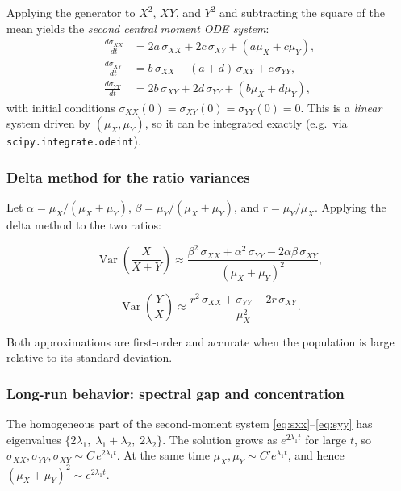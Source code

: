 \documentclass[12pt]{article}
\begin{document}
Applying the generator to $X^2$, $XY$, and $Y^2$ and subtracting the square
of the mean yields the \emph{second central moment ODE system}:
\begin{align}
	\frac{d\sigma_{XX}}{dt} &= 2a\,\sigma_{XX} + 2c\,\sigma_{XY}
	+ (a\mu_X + c\mu_Y), \label{eq:sxx}\\
	\frac{d\sigma_{XY}}{dt} &= b\,\sigma_{XX} + (a+d)\,\sigma_{XY}
	+ c\,\sigma_{YY}, \label{eq:sxy}\\
	\frac{d\sigma_{YY}}{dt} &= 2b\,\sigma_{XY} + 2d\,\sigma_{YY}
	+ (b\mu_X + d\mu_Y), \label{eq:syy}
\end{align}
with initial conditions $\sigma_{XX}(0)=\sigma_{XY}(0)=\sigma_{YY}(0)=0$.
This is a \emph{linear} system driven by $(\mu_X,\mu_Y)$, so it can be
integrated exactly (e.g.\ via \texttt{scipy.integrate.odeint}).

\subsubsection{Delta method for the ratio variances}

Let $\alpha = \mu_X/(\mu_X+\mu_Y)$, $\beta = \mu_Y/(\mu_X+\mu_Y)$,
and $r = \mu_Y/\mu_X$.  Applying the delta method to the two ratios:

\begin{equation}
	\operatorname{Var}\!\left(\frac{X}{X+Y}\right)
	\approx
	\frac{\beta^2\,\sigma_{XX} + \alpha^2\,\sigma_{YY}
		- 2\alpha\beta\,\sigma_{XY}}{(\mu_X+\mu_Y)^2},
	\label{eq:var_r1}
\end{equation}

\begin{equation}
	\operatorname{Var}\!\left(\frac{Y}{X}\right)
	\approx
	\frac{r^2\,\sigma_{XX} + \sigma_{YY} - 2r\,\sigma_{XY}}{\mu_X^2}.
	\label{eq:var_r2}
\end{equation}

Both approximations are first-order and accurate when the population is large
relative to its standard deviation.

\subsubsection{Long-run behavior: spectral gap and concentration}

The homogeneous part of the second-moment system \eqref{eq:sxx}--\eqref{eq:syy}
has eigenvalues $\{2\lambda_1,\; \lambda_1+\lambda_2,\; 2\lambda_2\}$.
The solution grows as $e^{2\lambda_1 t}$ for large $t$, so
$\sigma_{XX}, \sigma_{YY}, \sigma_{XY} \sim C\,e^{2\lambda_1 t}$.
At the same time $\mu_X, \mu_Y \sim C' e^{\lambda_1 t}$, and hence
$(\mu_X+\mu_Y)^2 \sim e^{2\lambda_1 t}$.
\end{document}
